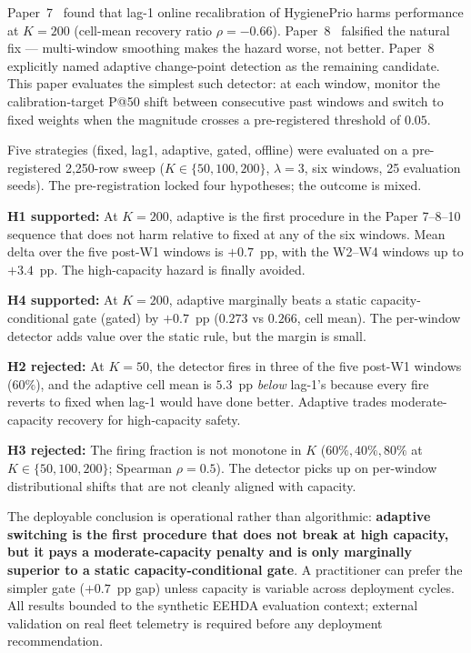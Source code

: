 Paper~7~\cite{paper7online} found that lag-1 online recalibration of
HygienePrio harms performance at $K = 200$ (cell-mean recovery ratio
$\rho = -0.66$). Paper~8~\cite{paper8multi} falsified the natural
fix --- multi-window smoothing makes the hazard worse, not better.
Paper~8 explicitly named adaptive change-point detection as the
remaining candidate. This paper evaluates the simplest such
detector: at each window, monitor the calibration-target P@50 shift
between consecutive past windows and switch to fixed weights when
the magnitude crosses a pre-registered threshold of $0.05$.

Five strategies (\textsf{fixed}, \textsf{lag1}, \textsf{adaptive},
\textsf{gated}, \textsf{offline}) were evaluated on a pre-registered
2{,}250-row sweep ($K \in \{50, 100, 200\}$, $\lambda = 3$, six
windows, 25 evaluation seeds). The pre-registration locked four
hypotheses; the outcome is mixed.

\textbf{H1 supported:} At $K = 200$, \textsf{adaptive} is the first
procedure in the Paper 7--8--10 sequence that does not harm relative
to \textsf{fixed} at any of the six windows. Mean delta over the
five post-W1 windows is $+0.7$~pp, with the W2--W4 windows up to
$+3.4$~pp. The high-capacity hazard is finally avoided.

\textbf{H4 supported:} At $K = 200$, \textsf{adaptive} marginally
beats a static capacity-conditional gate (\textsf{gated}) by $+0.7$~pp
($0.273$ vs $0.266$, cell mean). The per-window detector adds value
over the static rule, but the margin is small.

\textbf{H2 rejected:} At $K = 50$, the detector fires in three of
the five post-W1 windows ($60\%$), and the adaptive cell mean is
$5.3$~pp \textit{below} lag-1's because every fire reverts to
\textsf{fixed} when lag-1 would have done better. Adaptive trades
moderate-capacity recovery for high-capacity safety.

\textbf{H3 rejected:} The firing fraction is not monotone in $K$
($60\%, 40\%, 80\%$ at $K \in \{50, 100, 200\}$; Spearman
$\rho = 0.5$). The detector picks up on per-window distributional
shifts that are not cleanly aligned with capacity.

The deployable conclusion is operational rather than algorithmic:
\textbf{adaptive switching is the first procedure that does not
break at high capacity, but it pays a moderate-capacity penalty
and is only marginally superior to a static capacity-conditional
gate}. A practitioner can prefer the simpler gate ($+0.7$~pp gap)
unless capacity is variable across deployment cycles. All results
bounded to the synthetic EEHDA evaluation context; external validation
on real fleet telemetry is required before any deployment recommendation.
